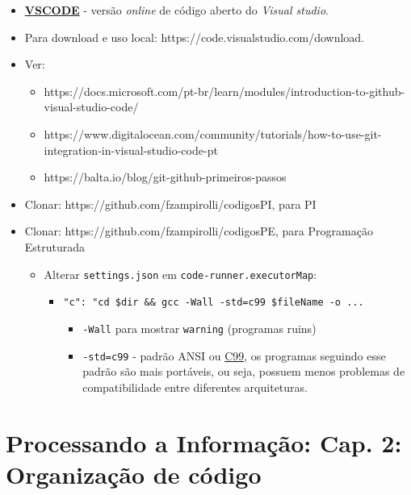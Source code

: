 \documentclass[12pt,a4paper]{article}
\providecommand{\tightlist}{%
      \setlength{\itemsep}{0pt}\setlength{\parskip}{0pt}}
\begin{document}
    \begin{itemize}
\item
  \textbf{\href{https://vscode.dev}{VSCODE}} - versão \emph{online} de
  código aberto do \emph{Visual studio}.
\item
  Para download e uso local: https://code.visualstudio.com/download.
\item
  Ver:

  \begin{itemize}
  \tightlist
  \item
    https://docs.microsoft.com/pt-br/learn/modules/introduction-to-github-visual-studio-code/
  \item
    https://www.digitalocean.com/community/tutorials/how-to-use-git-integration-in-visual-studio-code-pt
  \item
    https://balta.io/blog/git-github-primeiros-passos
  \end{itemize}
\item
  Clonar: https://github.com/fzampirolli/codigosPI, para PI
\item
  Clonar: https://github.com/fzampirolli/codigosPE, para Programação
  Estruturada

  \begin{itemize}
  \tightlist
  \item
    Alterar \texttt{settings.json} em \texttt{code-runner.executorMap}:

    \begin{itemize}
    \tightlist
    \item
      \texttt{"c":\ "cd\ \$dir\ \&\&\ gcc\ -Wall\ -std=c99\ \$fileName\ -o\ ...}

      \begin{itemize}
      \tightlist
      \item
        \texttt{-Wall} para mostrar \texttt{warning} (programas ruins)
      \item
        \texttt{-std=c99} - padrão ANSI ou
        \href{https://en.m.wikipedia.org/wiki/C99}{C99}, os programas
        seguindo esse padrão são mais portáveis, ou seja, possuem menos
        problemas de compatibilidade entre diferentes arquiteturas.
      \end{itemize}
    \end{itemize}
  \end{itemize}
\end{itemize}

    \hypertarget{processando-a-informauxe7uxe3o-cap.-2-organizauxe7uxe3o-de-cuxf3digo}{%
\section{Processando a Informação: Cap. 2: Organização de
código}\label{processando-a-informauxe7uxe3o-cap.-2-organizauxe7uxe3o-de-cuxf3digo}}
\end{document}
